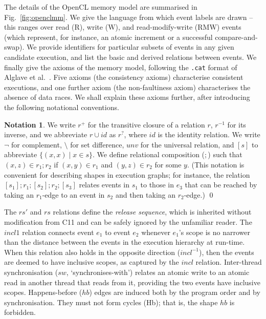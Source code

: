 \documentclass[svgnames,10pt]{sigplanconf}
\theoremstyle{definition}
\newtheorem*{notation}{Notation}
\newenvironment{Notation}{\begin{notation}}{\qed\end{notation}}
\newcommand\axiom[1]{\textsf{#1}}
\newcommand\var[1]{\mathit{#1}}
\newcommand\cat{\texttt{.cat}}
\newcommand\unv{\var{unv}}
\begin{document}
The details of the OpenCL memory model are summarised in
Fig.~\ref{fig:openclmm}. We give the language from which event labels
are drawn -- this ranges over read ($\mathrm{R}$), write
($\mathrm{W}$), and read-modify-write ($\mathrm{RMW}$) events (which
represent, for instance, an atomic increment or a successful
compare-and-swap). We provide identifiers for particular subsets of
events in any given candidate execution, and list the basic and
derived relations between events. We finally give the axioms of the
memory model, following the \cat{} format of Alglave et
al.~\cite{alglave+14}. Five axioms (the consistency
axioms) characterise consistent executions, and one further axiom (the
non-faultiness axiom) characterises the absence of data races. We
shall explain these axioms further, after introducing the following
notational conventions.

\begin{Notation}
We write $r^+$ for the transitive closure of a relation $r$, $r^{-1}$
for its inverse, and we abbreviate $r\cup\var{id}$ as $r^{?}$, where
$\var{id}$ is the identity relation. We write $\neg$ for complement,
$\setminus$ for set difference,
$\unv$ for the universal relation, and $[s]$ to abbreviate
$\{(x,x)\mid x\in s\}$. We define relational composition ($;$) such
that $(x,z)\in r_1; r_2$ if $(x,y)\in r_1$ and $(y,z)\in r_2$ for some
$y$. (This notation is convenient for describing shapes in execution
graphs; for instance, the relation $[s_1];r_1;[s_2];r_2;[s_3]$ relates
events in $s_1$ to those in $e_3$ that can be reached by taking an
$r_1$-edge to an event in $s_2$ and then taking an $r_2$-edge.)
\end{Notation}

The $\var{rs}'$ and $\var{rs}$ relations define the \emph{release
sequence}, which is inherited without modification from C11 and can be
safely ignored by the unfamiliar reader. The $\var{incl1}$ relation
connects event $e_1$ to event $e_2$ whenever $e_1$'s scope is no
narrower than the distance between the events in the execution
hierarchy at run-time. When this relation also holds in the opposite
direction ($\var{incl}^{-1}$), then the events are deemed to have
inclusive scopes, as captured by the $\var{incl}$
relation. Inter-thread synchronisation ($\var{sw}$,
`synchronises-with') relates an atomic write to an atomic read in another thread that
reads from it, providing the two events have inclusive
scopes. Happens-before ($\var{hb}$) edges are induced both by the
program order and by synchronisation. They must not form cycles
(\axiom{Hb}); that is, the shape \hspace{-2pt}\textcolor{colorhb}{$\var{hb}$} is forbidden. 
\end{document}
